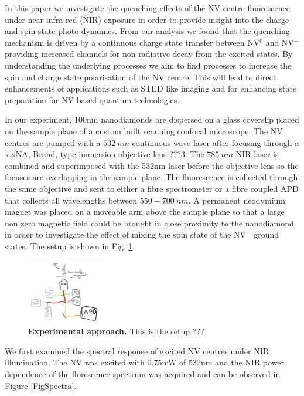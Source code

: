 \documentclass[prl]{revtex4}
\begin{document}
In this paper we investigate the quenching effects of the NV centre fluorescence under near infra-red (NIR) exposure in order to provide insight into the charge and spin state photo-dynamics. From our analysis we found that the quenching mechanism is driven by a continuous charge state transfer between NV$^0$ and NV$^-$ providing increased channels for non radiative decay from the excited states. By understanding the underlying processes we aim to find processes to increase the spin and charge state polarisation of the NV centre. This will lead to direct enhancements of applications such as STED like imaging and for enhancing state preparation for NV based quantum technologies.

In our experiment, 100nm nanodiamonds are dispersed on a glass coverslip placed on the sample plane of a custom built scanning confocal microscope. The NV centres are pumped with a $\SI{532}{nm}$ continuous wave laser after focusing through a x.xNA, Brand, type immersion objective lens ???3. The $\SI{785}{nm}$ NIR laser is combined and superimposed with the 532nm laser before the objective lens so the focuses are overlapping in the sample plane. The fluorescence is collected through the same objective and sent to either a fibre spectrometer or a fibre coupled APD that collects all wavelengths between $550-\SI{700}{nm}$. A permanent neodymium magnet was placed on a moveable arm above the sample plane so that a large non zero magnetic field could be brought in close proximity to the nanodiamond in order to investigate the effect of mixing the spin state of the NV$^-$ ground states. The setup is shown in Fig. \ref{FigSetup}.

\begin{figure}[t]
  \centering
  \includegraphics[width=0.3\textwidth]{Setup.png} 
 \caption{\textbf{Experimental approach.} This is the setup ???} \label{FigSetup}
\end{figure}

We first examined the spectral response of excited NV centres under NIR illumination. The NV was excited with 0.75mW of 532nm and the NIR power dependence of the florescence spectrum was acquired and can be observed in Figure \ref{FigSpectra}.
\end{document}
